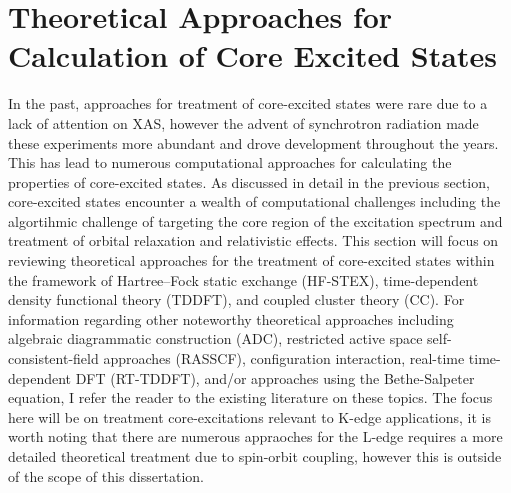 \documentclass{article}
\begin{document}
\section{Theoretical Approaches for Calculation of Core Excited States}
In the past, approaches for treatment of core-excited states were rare due to a lack of attention on XAS, however the advent of synchrotron radiation made these experiments more abundant and drove development throughout the years. This has lead to numerous computational approaches for calculating the properties of core-excited states. As discussed in detail in the previous section, core-excited states encounter a wealth of computational challenges including the algortihmic challenge of targeting the core region of the excitation spectrum and treatment of orbital relaxation and relativistic effects. This section will focus on reviewing theoretical approaches for the treatment of core-excited states within the framework of Hartree--Fock static exchange (HF-STEX),\cite{agren_direct_1994,hunt_excited_1969,zhang_nonlinear_2014,agren_direct_1997} time-dependent density functional theory (TDDFT), \cite{imamura_time-dependent_2006,besley_time-dependent_2007,lestrange_calibration_2015} and coupled cluster theory (CC).\cite{fransson_carbon_2013,besley_equation_2012,coriani_coupled-cluster_2012,coriani_asymmetric-lanczos-chain-driven_2012,myhre_near-edge_2016} For information regarding other noteworthy theoretical approaches including algebraic diagrammatic construction (ADC),\cite{wenzel_calculating_2014,wenzel_analysis_2015,wenzel_calculating_2014,wenzel_physical_2016} restricted active space self-consistent-field approaches (RASSCF),\cite{mochizuki_hf-stex_2001} configuration interaction,\cite{maganas_combined_2014,maganas_l-edge_2014,grimme_density_1996,asmuruf_calculation_2008} real-time time-dependent DFT (RT-TDDFT), \cite{lopata_linear-response_2012} and/or approaches using the Bethe-Salpeter equation,\cite{olovsson_near-edge_2009,vinson_theoretical_2012} I refer the reader to the existing literature on these topics. The focus here will be on treatment core-excitations relevant to K-edge applications, it is worth noting that there are numerous appraoches for the L-edge requires a more detailed theoretical treatment due to spin-orbit coupling,\cite{roemelt_combined_2013,ebert_l-edge_1996,maganas_first_2013} however this is outside of the scope of this dissertation. 
\end{document}
